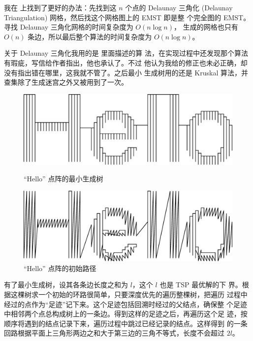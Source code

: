 \documentclass[cs4size,a4paper,adobefonts]{ctexart}
\begin{document}
我在 \cite{wiki:EMST} 上找到了更好的办法：先找到这 $n$ 个点的 Delaunay
三角化 (Delaunay Triangulation) 网格，然后找这个网格图上的 EMST 即是整
个完全图的 EMST。寻找 Delaunay 三角化网格的时间复杂度为 $O(n\log n)$，
生成的网格也只有 $O(n)$ 条边，所以最后整个算法的时间复杂度为 $O(n\log
n)$。

关于 Delaunay 三角化我用的是 \cite{Berg:2008:CGA:1370949} 里面描述的算
法，在实现过程中还发现那个算法有瑕疵，写信给作者指出，他也承认了。不过
他认为我给的修正也未必正确，却没有指出错在哪里，这我就不管了。之后最小
生成树用的还是 Kruskal 算法，并查集除了生成迷宫之外又被用到了一次。

\begin{figure}[htbp]
  \centering
  \begin{minipage}{0.5\textwidth}
    \centering
    \includegraphics[width=0.95\linewidth]{helloEMST}
    \caption{``Hello'' 点阵的最小生成树}\label{fig:helloEMST}
  \end{minipage}%
  \begin{minipage}{0.5\textwidth}
    \centering
    \includegraphics[width=0.95\linewidth]{helloInit}
    \caption{``Hello'' 点阵的初始路径}\label{fig:helloInit}
  \end{minipage}
\end{figure}

有了最小生成树，设其各条边长度之和为 $l$，这个 $l$ 也是 TSP 最优解的下
界。根据这棵树求一个初始的环路很简单，只要深度优先的遍历整棵树，把遍历
过程中经过的点作为“足迹”记下来。这个足迹包括回溯时经过的父结点，确保整
个足迹中相邻两个点总构成树上的一条边。得到这样的足迹之后，再遍历这个足
迹，按顺序将遇到的结点记录下来，遍历过程中跳过已经记录的结点。这样得到
的一条回路根据平面上三角形两边之和大于第三边的三角不等式，长度不会超过
$2l$。
\end{document}
